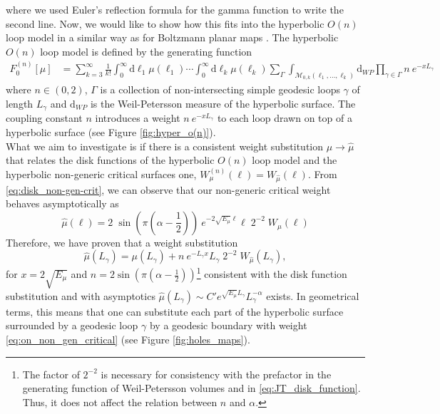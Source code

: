 \documentclass[a4paper,11pt]{article}
\newcommand{\rmd}{\mathrm{d}}
\begin{document}
where we used Euler's reflection formula for the gamma function to write the second line.
Now, we would like to show how this fits into the hyperbolic $O(n)$ loop model in a similar way as for Boltzmann planar maps \cite{Borot:2011kg}. The hyperbolic $O(n)$ loop model is defined by the generating function 
\begin{align}
    F^{(n)}_0[\mu] &= \sum_{k=3}^\infty\frac{1}{k!} \int_{0}^\infty \rmd \ell_1 \mu(\ell_1) \cdots \int_{0}^\infty \rmd \ell_k \mu(\ell_k)
	\sum_\Gamma \int_{\mathcal{M}_{0,k}(\ell_1,...,\ell_k)}\rmd_{WP} \prod_{\gamma\in \Gamma} n \ e^{-x L_\gamma}
\end{align}
where $n\in(0,2)$, $\Gamma$ is a collection of non-intersecting simple geodesic loops $\gamma$ of length $L_\gamma$ and $\rmd_{WP}$ is the Weil-Petersson measure of the hyperbolic surface. The coupling constant $n$ introduces a weight $n\ e^{-x L_\gamma}$ to each loop drawn on top of a hyperbolic surface (see Figure \ref{fig:hyper_o(n)}).\\  
What we aim to investigate is if there is a consistent weight substitution $\mu \rightarrow\hat{\mu}$ that relates the disk functions of the hyperbolic $O(n)$ loop model and the hyperbolic non-generic critical surfaces one, $W_\mu^{(n)}(\ell)=W_{\hat{\mu}}(\ell)$. From \eqref{eq:disk_non-gen-crit}, we can observe that our non-generic critical weight behaves asymptotically as
\begin{equation}
    \hat{\mu}(\ell)= 2\;\sin\left(\pi\left(\alpha-\frac{1}{2}\right)\right)  \ e^{-2\sqrt{E_\mu}\ell} \ell\; 2^{-2}\; W_{\hat{\mu}}(\ell)  \label{weigth_substitution_hypo(n)}
\end{equation}
Therefore, we have proven that a weight substitution 
\begin{equation}
    \hat{\mu}(L_\gamma) = \mu(L_\gamma) + n  \ e^{-L_\gamma x} L_\gamma \; 2^{-2}\;W_{\hat{\mu}}(L_\gamma),\label{eq:on_non_gen_critical}
\end{equation}
for $x=2\sqrt{E_\mu}$ and $n=2\sin\left(\pi\left(\alpha-\frac{1}{2}\right)\right)$\footnote{The factor of $2^{-2}$ is necessary for consistency with the prefactor in the generating function of Weil-Petersson volumes and in \eqref{eq:JT_disk_function}. Thus, it does not affect the relation between $n$ and $\alpha$.} consistent with the disk function substitution and with asymptotics $\hat{\mu}(L_\gamma)\sim C' e^{\sqrt{E_\mu }L_\gamma}L_\gamma^{-\alpha}$ exists. In geometrical terms, this means that one can substitute each part of the hyperbolic surface surrounded by a geodesic loop $\gamma$ by a geodesic boundary with weight \eqref{eq:on_non_gen_critical} (see Figure \ref{fig:holes_maps}).\\
\end{document}
